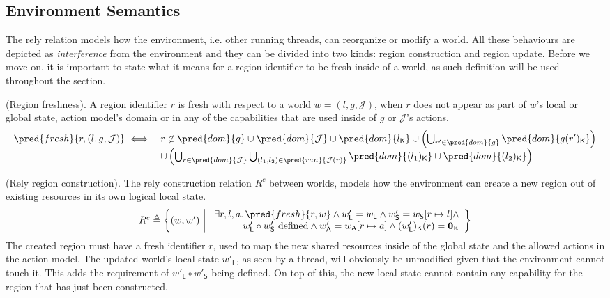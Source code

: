 \subsection{Environment Semantics}

The rely relation models how the environment, i.e. other running threads, can reorganize or modify a world. All these behaviours are depicted as \textit{interference} from the environment and they can be divided into two kinds: region construction and region update. Before we move on, it is important to state what it means for a region identifier to be fresh inside of a world, as such definition will be used throughout the section.

 (Region freshness). A region identifier $r$ is fresh with respect to a world $w = (l, g, \mathcal{J})$, when $r$ does not appear as part of $w$'s local or global state, action model's domain or in any of the capabilities that are used inside of $g$ or $\mathcal{J}$'s actions.
\[
\begin{array}{r l}
	\pred{fresh}{r, (l, g, \mathcal{J})} \iff
	&
	r \not\in \pred{dom}{g} \cup \pred{dom}{\mathcal{J}} \cup \pred{dom}{l_\mathsf{K}} \cup \left( \bigcup_{r' \in \pred{dom}{g}} \pred{dom}{g(r')_\mathsf{K}} \right)
	\\
	& \cup \left( \bigcup_{r \in \pred{dom}{\mathcal{J}}} \bigcup_{(l_1, l_2) \in \pred{ran}{\mathcal{J}(r)}} \pred{dom}{(l_1)_\mathsf{K}} \cup \pred{dom}{(l_2)_\mathsf{K}} \right)
\end{array}	
\]

 (Rely region construction). The rely construction relation $R^c$ between worlds, models how the environment can create a new region out of existing resources in its own logical local state.
\[
\begin{array}{r | l}
	R^c \triangleq \bigg\{ (w, w')
	&
	\begin{array}{r}
		\exists r, l, a \ldotp \pred{fresh}{r, w} \land w'_\mathsf{L} = w_\mathsf{L} \land w'_\mathsf{S} = w_\mathsf{S}[r \mapsto l] \land
		\\
		w'_\mathsf{L} \circ w'_\mathsf{S} \text{ defined} \land w'_\mathsf{A} = w_\mathsf{A}[r \mapsto a] \land (w'_\mathsf{L})_\mathsf{K}(r) = \mathbf{0}_\mathbb{K}
	\end{array}
	\bigg\}
\end{array}
\]
The created region must have a fresh identifier $r$, used to map the new shared resources inside of the global state and the allowed actions in the action model. The updated world's local state $w'_\mathsf{L}$, as seen by a thread, will obviously be unmodified given that the environment cannot touch it. This adds the requirement of $w'_\mathsf{L} \circ w'_\mathsf{S}$ being defined. On top of this, the new local state cannot contain any capability for the region that has just been constructed.

